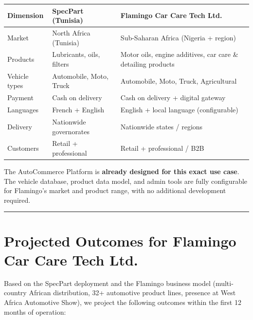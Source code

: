 \documentclass[11pt,a4paper]{article}
\begin{document}
\begin{center}
\renewcommand{\arraystretch}{1.5}
\begin{tabular}{@{}p{5.5cm}p{5cm}p{5cm}@{}}
\toprule
\textbf{Dimension} &
\textbf{SpecPart (Tunisia)} &
\textbf{Flamingo Car Care Tech Ltd.} \\
\midrule
Market & North Africa (Tunisia) & Sub-Saharan Africa (Nigeria + region) \\
Products & Lubricants, oils, filters & Motor oils, engine additives, car
                                       care \& detailing products \\
Vehicle types & Automobile, Moto, Truck & Automobile, Moto, Truck,
                                          Agricultural \\
Payment & Cash on delivery & Cash on delivery + digital gateway \\
Languages & French + English & English + local language (configurable) \\
Delivery & Nationwide governorates & Nationwide states / regions \\
Customers & Retail + professional & Retail + professional / B2B \\
\bottomrule
\end{tabular}
\end{center}

\noindent The AutoCommerce Platform is \textbf{already designed for
this exact use case}. The vehicle database, product data model, and
admin tools are fully configurable for Flamingo's market and product
range, with no additional development required.

\bigskip
\rule{\textwidth}{0.4pt}
\bigskip

\section*{Projected Outcomes for Flamingo Car Care Tech Ltd.}

Based on the SpecPart deployment and the Flamingo business model
(multi-country African distribution, 32+ automotive product lines,
presence at West Africa Automotive Show), we project the following
outcomes within the first 12 months of operation:
\end{document}
